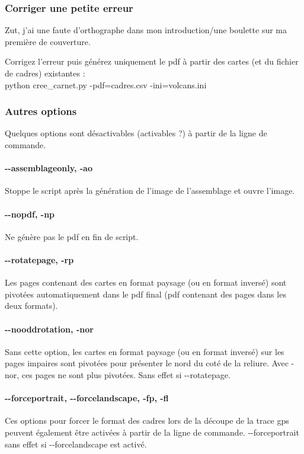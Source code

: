 \documentclass[12pt,french]{article}
\begin{document}
\subsubsection{Corriger une petite erreur}
Zut, j'ai une faute d'orthographe dans mon introduction/une boulette sur ma première de couverture.\par 
Corrigez l'erreur puis générez uniquement le pdf à partir des cartes (et du fichier de cadres) existantes :\\
python cree\_carnet.py -pdf=cadres.csv -ini=volcans.ini \par


\subsubsection{Autres options}
Quelques options sont désactivables (activables ?) à partir de la ligne de commande.
\paragraph{-\mbox{}-assemblageonly, -ao} Stoppe le script après la génération de l'image de l'assemblage et ouvre l'image.
\paragraph{-\mbox{}-nopdf, -np} Ne génère pas le pdf en fin de script.
\paragraph{-\mbox{}-rotatepage, -rp} Les pages contenant des cartes en format paysage (ou en format inversé) sont pivotées automatiquement dans le pdf final (pdf contenant des pages dans les deux formats).
\paragraph{-\mbox{}-nooddrotation, -nor} Sans cette option, les cartes en format paysage (ou en format inversé) sur les pages impaires sont pivotées pour présenter le nord du coté de la reliure. Avec -nor, ces pages ne sont plus pivotées. Sans effet si -\mbox{}-rotatepage.
\paragraph{-\mbox{}-forceportrait, -\mbox{}-forcelandscape, -fp, -fl} Ces options pour forcer le format des cadres lors de la découpe de la trace gps peuvent également être activées à partir de la ligne de commande. -\mbox{}-forceportrait sans effet si \mbox{-\mbox{}-forcelandscape} est activé.
\end{document}
